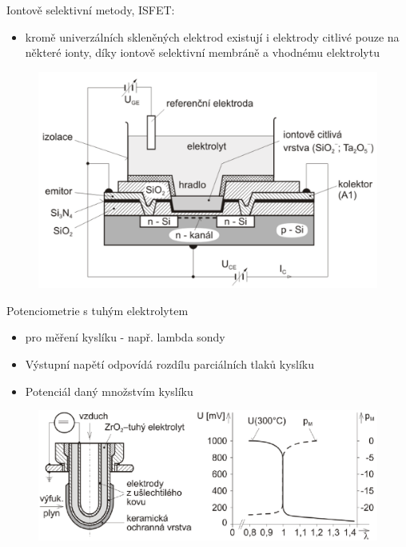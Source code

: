Iontově selektivní metody, ISFET:
\begin{itemize}
    \item kromě univerzálních skleněných elektrod existují i elektrody citlivé pouze na některé ionty, díky iontově selektivní membráně a vhodnému elektrolytu
\end{itemize}
\begin{figure}[h!]
    \centering
    \includegraphics[scale = 0.1]{img/IontSelMet.png}
\end{figure}
Potenciometrie s tuhým elektrolytem
\begin{itemize}
    \item pro měření kyslíku - např. lambda sondy
    \item Výstupní napětí odpovídá rozdílu parciálních tlaků kyslíku
    \item Potenciál daný množstvím kyslíku
\end{itemize}
\begin{figure}[h!]
    \centering
    \includegraphics[scale = 0.2]{img/TuhElekt.png}
\end{figure}

